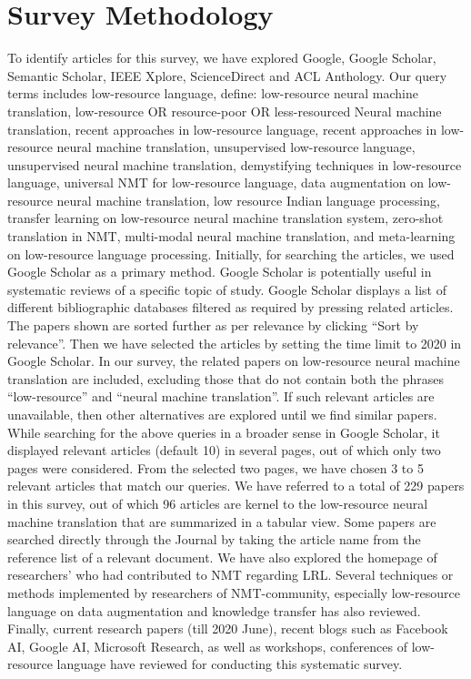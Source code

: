 \documentclass[manuscript,screen]{acmart}
\begin{document}
\section{Survey Methodology}
\label{method}
To identify articles for this survey, we have explored Google, Google Scholar, Semantic Scholar, IEEE Xplore, ScienceDirect and ACL Anthology. Our query terms includes low-resource language, define: low-resource neural machine translation, low-resource OR resource-poor OR less-resourced Neural machine translation, recent approaches in low-resource language, recent approaches in low-resource neural machine translation, unsupervised low-resource language, unsupervised neural machine translation, demystifying techniques in low-resource language, universal NMT for low-resource language, data augmentation on low-resource neural machine translation, low resource Indian language processing, transfer learning on low-resource neural machine translation system, zero-shot translation in NMT, multi-modal neural machine translation, and meta-learning on low-resource language processing. Initially, for searching the articles, we used Google Scholar as a primary method. Google Scholar is potentially useful in systematic reviews of a specific topic of study. Google Scholar displays a list of different bibliographic databases filtered as required by pressing related articles. The papers shown are sorted further as per relevance by clicking ``Sort by relevance''. Then we have selected the articles by setting the time limit to 2020 in Google Scholar. In our survey, the related papers on low-resource neural machine translation are included, excluding those that do not contain both the phrases ``low-resource'' and ``neural machine translation''. If such relevant articles are unavailable, then other alternatives are explored until we find similar papers. While searching for the above queries in a broader sense in Google Scholar, it displayed relevant articles (default 10) in several pages, out of which only two pages were considered. From the selected two pages, we have chosen 3 to 5 relevant articles that match our queries. We have referred to a total of 229 papers in this survey, out of which 96 articles are kernel to the low-resource neural machine translation that are summarized in a tabular view. Some papers are searched directly through the Journal by taking the article name from the reference list of a relevant document. We have also explored the homepage of researchers' who had contributed to NMT regarding LRL. Several techniques or methods implemented by researchers of NMT-community, especially low-resource language on data augmentation and knowledge transfer has also reviewed. Finally, current research papers (till 2020 June), recent blogs such as Facebook AI, Google AI, Microsoft Research, as well as workshops, conferences of low-resource language have reviewed for conducting this systematic survey. 
\end{document}
